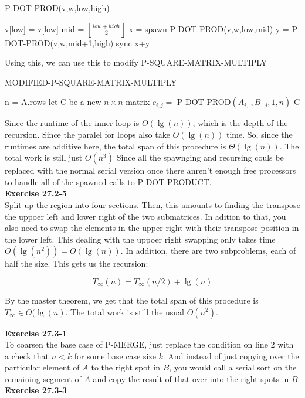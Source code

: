 \documentclass{article}
\begin{document}
\begin{algorithm}
\caption{P-DOT-PROD(v,w,low,high)}
\begin{algorithmic}
\State \Return  v[low] = v[low]
\EndIf
\State mid = $\left\lfloor \frac{low+high}{2}\right\rfloor$
\State x = spawn P-DOT-PROD(v,w,low,mid)
\State y = P-DOT-PROD(v,w,mid+1,high)
\State sync
\State \Return x+y
\end{algorithmic}
\end{algorithm}

Using this, we can use this to modify P-SQUARE-MATRIX-MULTIPLY

\begin{algorithm}
\caption{MODIFIED-P-SQUARE-MATRIX-MULTIPLY}
\begin{algorithmic}
\State n = A.rows
\State let C be a new $n\times n$ matrix
\State $c_{i,j} =$ P-DOT-PROD$(A_{i,\cdot},B_{\cdot,j},1,n)$
\EndParFor
\EndParFor
\State \Return C
\end{algorithmic}
\end{algorithm}

Since the runtime of the inner loop is $O(\lg(n))$, which is the depth of the recursion. Since the paralel for loops also take $O(\lg(n))$ time. So, since the runtimes are additive here, the total span of this procedure is $\Theta(\lg(n))$. The total work is still just $O(n^3)$ Since all the spawnging and recursing couls be replaced with the normal serial version once there anren't enough free processors to handle all of the spawned calls to P-DOT-PRODUCT. \\


\noindent\textbf{Exercise 27.2-5}\\
Split up the region into four sections. Then, this amounts to finding the transpose the uppoer left and lower right of the two submatrices. In adition to that, you also need to swap the elements in the upper right with their transpose position in the lower left. This dealing with the uppoer right swapping only takes time $O(\lg(n^2)) = O(\lg(n))$. In addition, there are two subproblems, each of half the size. This gets us the recursion:

\[
T_{\infty}(n) = T_{\infty}(n/2) + \lg(n)
\]

By the master theorem, we get that the total span of this procedure is $T_{\infty} \in O(\lg(n)$. The total work is still the usual $O(n^2)$.


\noindent\textbf{Exercise 27.3-1}\\
To coarsen the base case of P-MERGE, just replace the condition on line 2 with a check that $n<k$ for some base case size $k$. And instead of just copying over the particular element of $A$ to the right spot in $B$,  you would call a serial sort on the remaining segment of $A$ and copy the result of that over into the right spots in $B$.\\

\noindent\textbf{Exercise 27.3-3}\\
\end{document}
